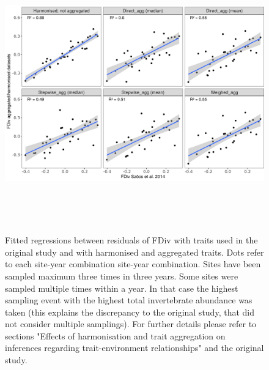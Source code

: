 \documentclass[12pt]{article}
\begin{document}
\begin{figure}[ht]
    \centering
    \includegraphics[width=17cm, height=12cm]{Correlation_fd_metrics_FDiv.png}
    \caption{Fitted regressions between residuals of FDiv with traits used in the original study and with harmonised and aggregated traits. Dots refer to each site-year combination site-year combination. Sites have been sampled maximum three times in three years. Some sites were sampled multiple times within a year. In that case the highest sampling event with the highest total invertebrate abundance was taken (this explains the discrepancy to the original study, that did not consider multiple samplings). For further details please refer to sections "Effects of harmonisation and trait aggregation on inferences regarding trait-environment relationships" and the original study.}
    \label{fig:FDiv}
\end{figure}
\end{document}
